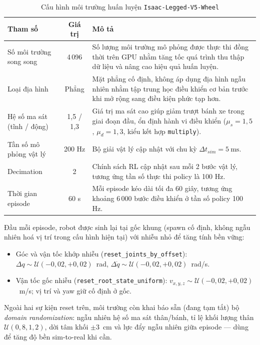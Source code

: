 \begin{table}[H]
    \centering
    \caption{Cấu hình môi trường huấn luyện \texttt{Isaac-Legged-V5-Wheel}}
    \label{tab:wheel_env}
    \renewcommand{\arraystretch}{1.3}
    \begin{tabular}{|p{4.0cm}|c|p{7.5cm}|}
    \hline
    \textbf{Tham số} & \textbf{Giá trị} & \textbf{Mô tả} \\
    \hline
    Số môi trường song song &
    4\,096 &
    Số lượng môi trường mô phỏng được thực thi đồng thời trên GPU nhằm tăng tốc quá trình thu thập dữ liệu và nâng cao hiệu quả huấn luyện. \\
    \hline
    Loại địa hình &
    Phẳng &
    Mặt phẳng cố định, không áp dụng địa hình ngẫu nhiên nhằm tập trung học điều khiển cơ bản trước khi mở rộng sang điều kiện phức tạp hơn. \\
    \hline
    Hệ số ma sát (tĩnh / động) &
    1{,}5 / 1{,}3 &
    Giá trị ma sát cao giúp giảm trượt bánh xe trong giai đoạn đầu, ổn định hành vi điều khiển ($\mu_s{=}1{,}5$, $\mu_d{=}1{,}3$, kiểu kết hợp \texttt{multiply}). \\
    \hline
    Tần số mô phỏng vật lý &
    200 Hz &
    Bộ giải vật lý cập nhật với chu kỳ $\Delta t_{sim}=5~\mathrm{ms}$. \\
    \hline
    Decimation &
    2 &
    Chính sách RL cập nhật sau mỗi 2 bước vật lý, tương ứng tần số thực thi policy là 100 Hz. \\
    \hline
    Thời gian episode &
    60 s &
    Mỗi episode kéo dài tối đa 60 giây, tương ứng khoảng 6\,000 bước điều khiển ở tần số policy 100 Hz. \\
    \hline
    \end{tabular}
\end{table}

Đầu mỗi episode, robot được sinh lại tại gốc khung (spawn cố định, không
ngẫu nhiên hoá vị trí trong cấu hình hiện tại) với nhiễu nhỏ để tăng tính
bền vững:
\begin{itemize}
    \item Góc và vận tốc khớp nhiễu (\texttt{reset\_joints\_by\_offset}):
    $\Delta q\sim\mathcal{U}(-0{,}02,+0{,}02)$~rad,
    $\Delta\dot{q}\sim\mathcal{U}(-0{,}02,+0{,}02)$~rad/s.
    \item Vận tốc gốc nhiễu (\texttt{reset\_root\_state\_uniform}):
    $v_{x,y,z}\sim\mathcal{U}(-0{,}02,+0{,}02)$~m/s; vị trí và yaw giữ cố
    định ở gốc.
\end{itemize}

Ngoài hai sự kiện reset trên, môi trường còn khai báo sẵn (đang tạm tắt) bộ
\textit{domain randomization}: ngẫu nhiên hệ số ma sát thân/bánh, tỉ lệ
khối lượng thân $\mathcal{U}(0{,}8,1{,}2)$, dời tâm khối $\pm3$~cm và lực
đẩy ngẫu nhiên giữa episode — dùng để tăng độ bền sim-to-real khi cần.

